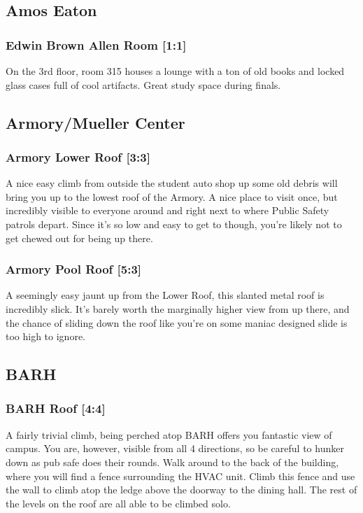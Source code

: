 \documentclass{article}
\begin{document}
\pagebreak
\subsection{Amos Eaton}
\subsubsection{Edwin Brown Allen Room [1:1]}
On the 3rd floor, room 315 houses a lounge with a ton of old books and locked glass cases full of cool artifacts. Great study space during finals.



\pagebreak
\subsection{Armory/Mueller Center}
\subsubsection{Armory Lower Roof [3:3]}
A nice easy climb from outside the student auto shop up some old debris will bring you up to the lowest roof of the Armory. A nice place to visit once, but incredibly visible to everyone around and right next to where Public Safety patrols depart. Since it’s so low and easy to get to though, you’re likely not to get chewed out for being up there.
\subsubsection{Armory Pool Roof [5:3]}
A seemingly easy jaunt up from the Lower Roof, this slanted metal roof is incredibly slick. It’s barely worth the marginally higher view from up there, and the chance of sliding down the roof like you’re on some maniac designed slide is too high to ignore.
\pagebreak

\subsection{BARH}
\subsubsection{BARH Roof [4:4]}
A fairly trivial climb, being perched atop BARH offers you fantastic view of campus. You are, however, visible from all 4 directions, so be careful to hunker down as pub safe does their rounds. Walk around to the back of the building, where you will find a fence surrounding the HVAC unit. Climb this fence and use the wall to climb atop the ledge above the doorway to the dining hall. The rest of the levels on the roof are all able to be climbed solo.
\end{document}
